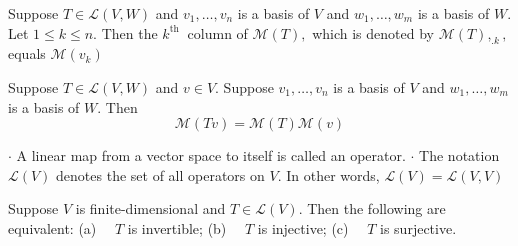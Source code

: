 Suppose $T \in \mathcal{L}(V, W)$ and $v_{1}, \ldots, v_{n}$ is a basis of $V$ and $w_{1}, \ldots, w_{m}$ is a basis of $W .$ Let $1 \leq k \leq n .$ Then the $k^{\text {th }}$ column of $\mathcal{M}(T),$ which is denoted by $\mathcal{M}(T),_{. k},$ equals $\mathcal{M}\left(v_{k}\right)$

Suppose $T \in \mathcal{L}(V, W)$ and $v \in V .$ Suppose $v_{1}, \ldots, v_{n}$ is a basis of $V$ and $w_{1}, \ldots, w_{m}$ is a basis of $W .$ Then
$$
\mathcal{M}(T v)=\mathcal{M}(T) \mathcal{M}(v)
$$

$\cdot$ A linear map from a vector space to itself is called an operator.
$\cdot$ The notation $\mathcal{L}(V)$ denotes the set of all operators on $V $. In other words, $\mathcal{L}(V)=\mathcal{L}(V, V)$

Suppose $V$ is finite-dimensional and $T \in \mathcal{L}(V) .$ Then the following are equivalent:
(a) $\quad T$ is invertible;
(b) $\quad T$ is injective;
(c) $\quad T$ is surjective.